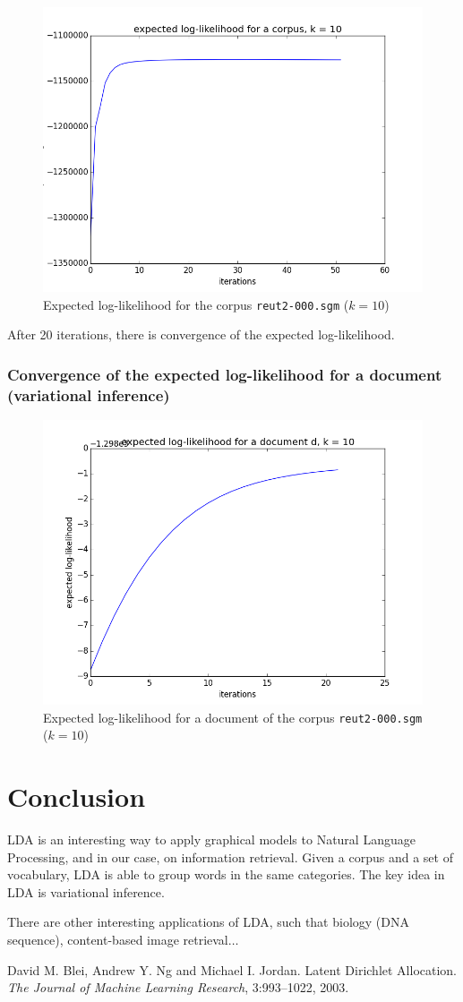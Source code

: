 \documentclass{article}
\begin{document}
\begin{figure}[ht!]
\begin{center}
\includegraphics[width=0.5\linewidth]{img/k=10/log_likelihood_corpus_k=10.png}
\caption{Expected log-likelihood for the corpus \texttt{reut2-000.sgm} ($k=10$)}
\end{center}
\end{figure}

After 20 iterations, there is convergence of the expected log-likelihood.

\subsubsection*{Convergence of the expected log-likelihood for a document (variational inference)}

\begin{figure}[ht!]
\begin{center}
\includegraphics[width=0.5\linewidth]{img/k=10/log_likelihood_document_k=10.png}
\caption{Expected log-likelihood for a document of the corpus \texttt{reut2-000.sgm} ($k=10$)}
\end{center}
\end{figure}

\section{Conclusion}

LDA is an interesting way to apply graphical models to Natural Language Processing, and in our case, on information retrieval. Given a corpus and a set of vocabulary, LDA is able to group words in the same categories. The key idea in LDA is variational inference. 

There are other interesting applications of LDA, such that biology (DNA sequence), content-based image retrieval$\ldots$

\begin{thebibliography}{BNJ03}
 David M. Blei, Andrew Y. Ng and Michael I. Jordan. Latent Dirichlet Allocation. \emph{The Journal of Machine Learning Research}, 3:993--1022, 2003.
\end{thebibliography}
\end{document}
